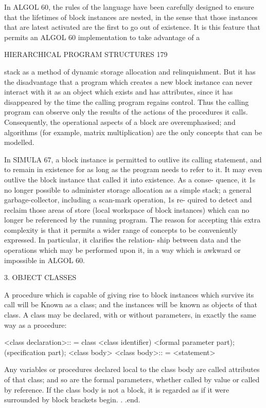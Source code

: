 In ALGOL 60, the rules of the language have been carefully designed to ensure that the lifetimes of block instances are nested, in the sense that those instances that are latest activated are the first to go out of existence. It is this feature that permits an ALGOL 60 implementation to take advantage of a

HIERARCHICAL PROGRAM STRUCTURES 179

stack as a method of dynamic storage allocation and relinquishment. But it has the disadvantage that a program which creates a new block instance can never interact with it as an object which exists and has attributes, since it has disappeared by the time the calling program regains control. Thus the calling program can observe only the results of the actions of the procedures it calls. Consequently, the operational aspects of a block are overemphasised; and algorithms (for example, matrix multiplication) are the only concepts that can be modelled.

In SIMULA 67, a block instance is permitted to outlive its calling statement, and to remain in existence for as long as the program needs to refer to it. It may even outlive the block instance that called it into existence. As a conse- quence, it 1s no longer possible to administer storage allocation as a simple stack; a general garbage-collector, including a scan-mark operation, 1s re- quired to detect and reclaim those areas of store (local workspace of block instances) which can no longer be referenced by the running program. The reason for accepting this extra complexity is that it permits a wider range of concepts to be conveniently expressed. In particular, it clarifies the relation- ship between data and the operations which may be performed upon it, in a way which is awkward or impossible in ALGOL 60.

3. OBJECT CLASSES

A procedure which is capable of giving rise to block instances which survive its call will be Known as a class; and the instances will be known as objects of that class. A class may be declared, with or without parameters, in exactly the same way as a procedure:

<class declaration>:: = class <class identifier) <formal parameter part); (specification part); <class body> <class body>:: = <statement>

Any variables or procedures declared local to the class body are called attributes of that class; and so are the formal parameters, whether called by value or called by reference. If the class body is not a block, it is regarded as if it were surrounded by block brackets begin. . .end.

